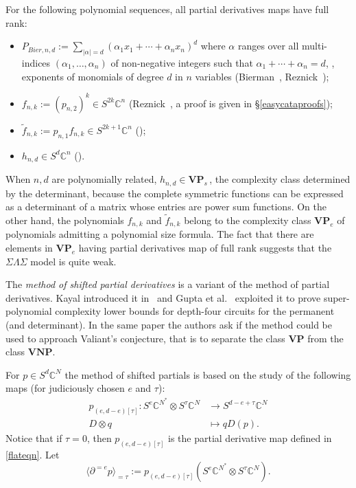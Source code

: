 \documentclass{toc}
\newcommand{\vvirg}{ , \dots , }
\renewcommand{\tilde}[1]{\widetilde{#1}}
\newcommand{\bfVNP}{\mathbf{VNP}}
\newcommand{\bfVP}{\mathbf{VP}}
\def\BC{\mathbb C}
\def\t{\tau}
\begin{document}
For the following polynomial sequences, all partial derivatives
%
maps   %
have full rank:
\begin{itemize}
\item $P_{Bier, n,d}:=\sum_{\vert \alpha\vert = d}(\alpha_{1}x_1+\cdots + \alpha_{n} x_{n})^d$ where $\alpha$ ranges over all  multi-indices  $(\alpha_{1}\vvirg  \alpha_{n})$  of non-negative integers  such that $\alpha_{1}+\cdots + \alpha_{n}=d$, \ie,  %
exponents of monomials of degree $d$ in $n$ variables (Bierman~\cite{MR1547094}, Reznick~\cite{MR1096187});
 
\item $f_{n,k}:=(p_{n,2})^k\in S^{2k}\BC^n$\quad
%
(Reznick~\cite{MR1096187}, a proof is given in \S\ref{easycataproofs});
 
\item $\tilde f_{n,k}:=p_{n,1}f_{n,k}\in S^{2k+1}\BC^n$\quad
();
 
\item $h_{n,d}\in S^d\BC^n$\quad
  ().
 \end{itemize}
 
 When $n,d$ are polynomially related, $h_{n,d}\in \bfVP_s$\,, the complexity class determined by the determinant,  because the complete symmetric functions can be expressed as a determinant of a matrix whose entries are power sum functions. On the other hand, the polynomials $f_{n,k}$ and $\tilde{f}_{n,k}$ belong to the complexity class $\bfVP_e$ of polynomials admitting a polynomial size formula. The fact that there are elements in $\bfVP_e$ having partial derivatives map of full rank suggests that the $\Sigma\Lambda\Sigma$ model is quite weak.
 
    
The \emph{method of shifted partial derivatives} is a variant of the method of partial derivatives. %
Kayal introduced it in~\cite{DBLP:journals/eccc/Kayal12} and Gupta et al.~\cite{gupta4} exploited it to prove super-polynomial complexity lower bounds for depth-four circuits for the permanent (and determinant). In the same paper the authors ask if the method could be used to approach Valiant's conjecture, that is to separate the class $\bfVP$ from the class $\bfVNP$.

For $p\in S^d\BC^N$  the method of shifted partials is based on the study of the following maps (for judiciously chosen $e$ and $\tau$):
\begin{align*}
p_{(e,d-e)[\t]}:S^{e}\BC^{N^*}\otimes S^\tau \BC^N& \to S^{d-e+\tau}\BC^N\\
D\otimes q&\mapsto qD(p).
\end{align*}
Notice that if $\tau = 0$, then $p_{(e,d-e)[\tau]}$ is the partial derivative map defined in \eqref{flateqn}. Let
\[
  \langle \partial^{=e}p\rangle_{=\t}:=p_{(e,d-e)[\t]}(S^{e}\BC^{N^*}\otimes S^\tau \BC^N).
\]
\end{document}
